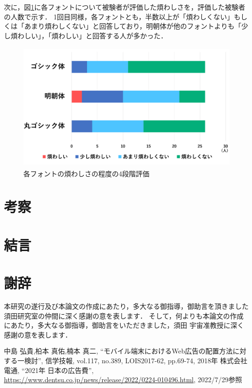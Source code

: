 \documentclass[12pt,a4j,titlepage]{ltjsarticle}
\begin{document}
次に，図\ref{fig:煩わしさ_2}に各フォントについて被験者が評価した煩わしさを，評価した被験者の人数で示す．
1回目同様，各フォントとも，半数以上が「煩わしくない」もしくは「あまり煩わしくない」と回答しており，明朝体が他のフォントよりも「少し煩わしい」，「煩わしい」と回答する人が多かった．

\begin{figure}[h]
\begin{center}
 \includegraphics[height=65mm]{figures/煩わしさ_2.pdf}
\end{center}
 \caption{各フォントの煩わしさの程度の4段階評価}
 \label{fig:煩わしさ_2}
\end{figure}

\clearpage

\section{考察}

\clearpage

\section{結言}

\clearpage

\section{謝辞}
本研究の遂行及び本論文の作成にあたり，多大なる御指導，御助言を頂きました須田研究室の仲間に深く感謝の意を表します．
そして，何よりも本論文の作成にあたり，多大なる御指導，御助言をいただきました，須田 宇宙准教授に深く感謝の意を表します．

\clearpage

\begin{thebibliography}{99}
 中島 弘貴,柗本 真佑,楠本 真二, ``モバイル端末におけるWeb広告の配置方法に対する一検討'', 信学技報, vol.117, no.389, LOIS2017-62, pp.69-74, 2018年
 株式会社電通, ``2021年 日本の広告費'', \url{https://www.dentsu.co.jp/news/release/2022/0224-010496.html}, 2022/7/29参照
\end{thebibliography}
\end{document}
